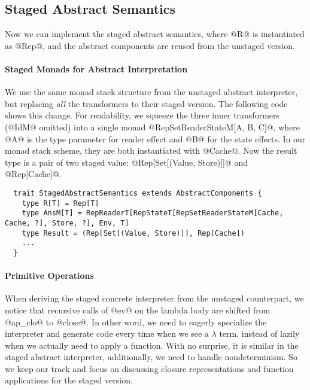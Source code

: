 \subsection{Staged Abstract Semantics}

Now we can implement the staged abstract semantics, where @R@ is instantiated as
@Rep@, and the abstract components are reused from the unstaged version.

\paragraph{Staged Monads for Abstract Interpretation}
We use the same monad stack structure from the unstaged abstract interpreter,
but replacing \textit{all} the transformers to their staged version. The
following code shows this change. For readability, we squeeze the three inner
transformers (@IdM@ omitted) into a single monad @RepSetReaderStateM[A, B, C]@,
where @A@ is the type parameter for reader effect and @B@ for the state effects.
In our monad stack scheme, they are both instantiated with @Cache@. Now the
result type is a pair of two staged value: @Rep[Set[(Value, Store)]]@ and
@Rep[Cache]@.
\begin{lstlisting}
  trait StagedAbstractSemantics extends AbstractComponents {
    type R[T] = Rep[T]
    type AnsM[T] = RepReaderT[RepStateT[RepSetReaderStateM[Cache, Cache, ?], Store, ?], Env, T]
    type Result = (Rep[Set[(Value, Store)]], Rep[Cache])
    ...
  }
\end{lstlisting}

\iffalse
Since our monad stack is uniformly using staged data, the staged @SetT@ now
stores a staged value of type @Rep[Set[A]]@, inside of another staged monad @M@.
\begin{lstlisting}
  case class SetT[M[_]: RepMonad, A](run: M[Set[A]]) {
    def flatMap[B: Manifest](f: Rep[A] => SetT[M, B]): SetT[M, B] = ...
  }
\end{lstlisting}
\fi

\paragraph{Primitive Operations} When deriving the staged concrete interpreter
from the unstaged counterpart, we notice that recursive calls of @ev@ on the
lambda body are shifted from @ap_clo@ to @close@. In other word, we need to
eagerly specialize the interpreter and generate code every time when we see a
$\lambda$ term, instead of lazily when we actually need to apply a function.
With no surprise, it is similar in the staged abstract interpreter,
additionally, we need to handle nondeterminism. So we keep our track and focus
on discussing closure representations and function applications for the staged
version.

